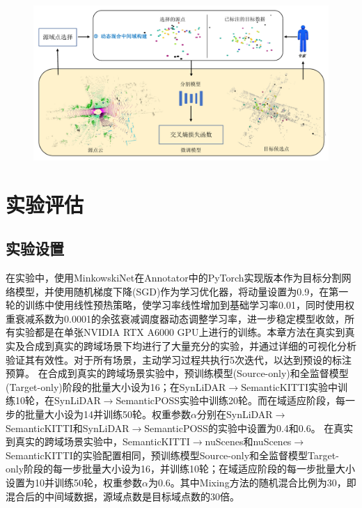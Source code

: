 \vspace{-0.1cm}
\begin{figure}[h]
    \centering
    \includegraphics[width = \textwidth, scale=0.5]{ljx/figure/3-4.pdf}
    \label{fig:3-4}
\end{figure}
\vspace{-0.5cm}
\section{实验评估}
\subsection{实验设置}
在实验中，使用MinkowskiNet在Annotator中的PyTorch实现版本作为目标分割网络模型，并使用随机梯度下降(SGD)作为学习优化器，将动量设置为0.9，在第一轮的训练中使用线性预热策略，使学习率线性增加到基础学习率0.01，同时使用权重衰减系数为0.0001的余弦衰减调度器动态调整学习率，进一步稳定模型收敛，所有实验都是在单张NVIDIA RTX A6000 GPU上进行的训练。本章方法在真实到真实及合成到真实的跨域场景下均进行了大量充分的实验，并通过详细的可视化分析验证其有效性。对于所有场景，主动学习过程共执行5次迭代，以达到预设的标注预算。
在合成到真实的跨域场景实验中，预训练模型(Source-only)和全监督模型(Target-only)阶段的批量大小设为16；在SynLiDAR$\to$SemanticKITTI实验中训练10轮，在SynLiDAR$\to$SemanticPOSS实验中训练20轮。而在域适应阶段，每一步的批量大小设为14并训练50轮。权重参数$\alpha$分别在SynLiDAR$\to$ SemanticKITTI和SynLiDAR$\to$SemanticPOSS的实验中设置为0.4和0.6。
在真实到真实的跨域场景实验中，SemanticKITTI$\to$nuScenes和nuScenes$\to$SemanticKITTI的实验配置相同，预训练模型Source-only和全监督模型Target-only阶段的每一步批量大小设为16，并训练10轮；在域适应阶段的每一步批量大小设置为10并训练50轮，权重参数$\alpha$为0.6。其中Mixing方法的随机混合比例为30，即混合后的中间域数据，源域点数是目标域点数的30倍。
